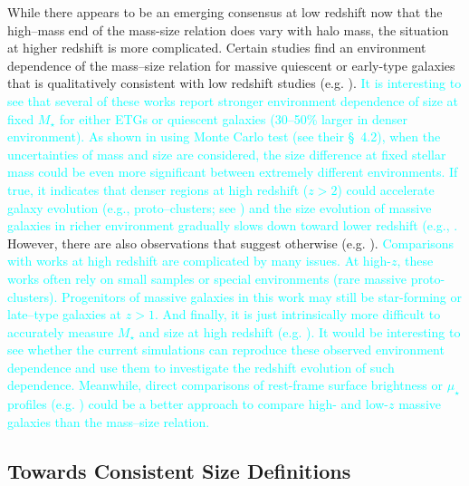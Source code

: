\documentclass[a4paper,fleqn,usenatbib]{mnras}
\def\mstar{{$M_{\star}$}}
\def\mden{{$\mu_{\star}$}}
\newcommand{\song}[1]{\textcolor{cyan}{#1}}
\begin{document}
    While there appears to be an emerging consensus at low redshift now that the 
    high--mass end of the mass-size relation does vary with halo mass, the situation 
    at higher redshift is more complicated. 
    Certain studies find an environment dependence of the mass--size relation for 
    massive quiescent or early-type galaxies that is qualitatively consistent with low 
    redshift studies (e.g. \citealt{Papovich2012, Bassett2013, Lani2013, 
    Strazzullo2013, Delaye2014}). 
    \song{
    It is interesting to see that several of these works report stronger 
    environment dependence of size at fixed \mstar{} for either ETGs or quiescent 
    galaxies (30--50\% larger in denser environment).
    As shown in \citet{HCompany13} using Monte Carlo test (see their \S~4.2), 
    when the uncertainties of mass and size are considered, the size difference at 
    fixed stellar mass could be even more significant between extremely different
    environments.
    If true, it indicates that denser regions at high redshift ($z>2$) could accelerate 
    galaxy evolution (e.g., proto--clusters; see \citealt{Wang2016, Shimakawa2018}) and 
    the size evolution of massive galaxies in richer environment gradually slows down
    toward lower redshift (e.g., \citealt{Papovich2012, Andreon2016}.
    }
    However, there are also observations that suggest otherwise (e.g. 
    \citealt{Rettura2010, Raichoor2012, Kelkar2015, Allen2015}). 
    \song{
    Comparisons with works at high redshift are complicated by many issues. 
    At high-$z$, these works often rely on small samples or special environments 
    (rare massive proto-clusters). 
    Progenitors of massive galaxies in this work may still be star-forming or 
    late--type galaxies at $z>1$. 
    And finally, it is just intrinsically more difficult to accurately measure 
    \mstar{} and size at high redshift (e.g. \citealt{Price2017}).
    It would be interesting to see whether the current simulations can reproduce 
    these observed environment dependence and use them to investigate the redshift
    evolution of such dependence. 
    Meanwhile, direct comparisons of rest-frame surface brightness or \mden{} 
    profiles (e.g. \citealt{Szomoru2012, Patel2013, Buitrago2017, Hill2017}) could be 
    a better approach to compare high- and low-$z$ massive galaxies than the 
    mass--size relation.
    }
    
\subsection{Towards Consistent Size Definitions}
        
\end{document}
